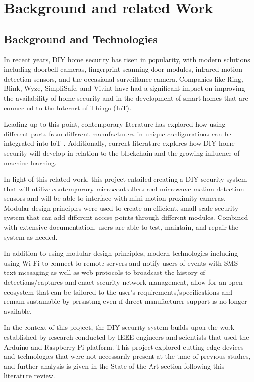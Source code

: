 \documentclass[conference]{IEEEtran}
\begin{document}
\section{Background and related Work}

\subsection{Background and Technologies}

In recent years, DIY home security has risen in popularity, with modern solutions including
doorbell cameras, fingerprint-scanning door modules, infrared motion detection sensors, and
the occasional surveillance camera. Companies like Ring, Blink, Wyze, SimpliSafe, and Vivint
have had a significant impact on improving the availability of home security and in the
development of smart homes that are connected to the Internet of Things (IoT).

Leading up to this point, contemporary literature has explored how using different parts
from different manufacturers in unique configurations can be integrated into
IoT \cite{sarhan2020}. Additionally, current literature explores how DIY home security
will develop in relation to the blockchain \cite{arifEtAl_2020} and the growing influence
of machine learning\cite{khanEtAl2021}.

In light of this related work, this project entailed creating a DIY security system that
will utilize contemporary microcontrollers and microwave motion detection sensors and
will be able to interface with mini-motion proximity cameras. Modular design principles
were used to create an efficient, small-scale security system that can add different access
points through different modules. Combined with extensive documentation, users are able
to test, maintain, and repair the system as needed.

In addition to using modular design principles, modern technologies including using Wi-Fi
to connect to remote servers and notify users of events with SMS text messaging as well
as web protocols to broadcast the history of detections/captures and enact security
network management, allow for an open ecosystem that can be tailored to the user’s
requirements/specifications and remain sustainable by persisting even if direct
manufacturer support is no longer available.

In the context of this project, the DIY security system builds upon the work established
by research conducted by IEEE engineers and scientists that used the Arduino and
Raspberry Pi platform. This project explored cutting-edge devices and technologies
that were not necessarily present at the time of previous studies, and further analysis
is given in the State of the Art section following this literature review.
\end{document}
